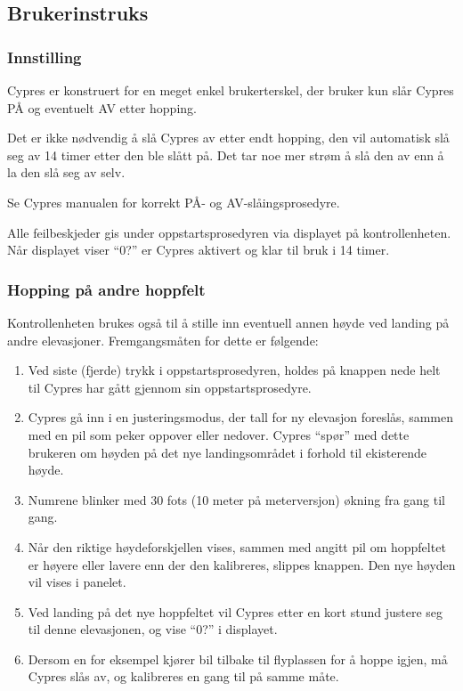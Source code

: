 \subsection{Brukerinstruks}
\subsubsection{Innstilling}
Cypres er konstruert for en meget enkel brukerterskel, der bruker kun slår Cypres PÅ og eventuelt AV etter hopping.

Det er ikke nødvendig å slå Cypres av etter endt hopping, den vil automatisk slå seg av 14 timer etter den ble slått på. Det tar noe mer strøm å slå den av enn å la den slå seg av selv.

Se Cypres manualen for korrekt PÅ- og AV-slåingsprosedyre.

Alle feilbeskjeder gis under oppstartsprosedyren via displayet på kontrollenheten. Når displayet viser ``0?'' er Cypres aktivert og klar til bruk i 14 timer.

\subsubsection{Hopping på andre hoppfelt}
Kontrollenheten brukes også til å stille inn eventuell annen høyde ved landing på andre elevasjoner. Fremgangsmåten for dette er følgende:
\begin{enumerate}
\item Ved siste (fjerde) trykk i oppstartsprosedyren, holdes på knappen nede helt til Cypres har gått gjennom sin oppstartsprosedyre.
\item Cypres gå inn i en justeringsmodus, der tall for ny elevasjon foreslås, sammen med en pil som peker oppover eller nedover. Cypres ``spør'' med dette brukeren om høyden på det nye landingsområdet i forhold til ekisterende høyde.
\item Numrene blinker med 30 fots (10 meter på meterversjon) økning fra gang til gang.
\item Når den riktige høydeforskjellen vises, sammen med angitt pil om hoppfeltet er høyere eller lavere enn der den kalibreres, slippes knappen. Den nye høyden vil vises i panelet.
\item Ved landing på det nye hoppfeltet vil Cypres etter en kort stund justere seg til denne elevasjonen, og vise ``0?'' i displayet.
\item Dersom en for eksempel kjører bil tilbake til flyplassen for å hoppe igjen, må Cypres slås av, og kalibreres en gang til på samme måte.
\end{enumerate}

